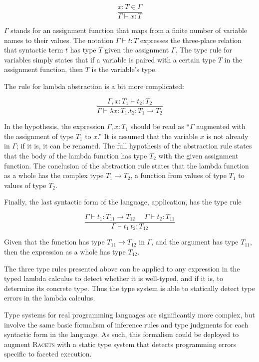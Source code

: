 \documentclass{article}
\begin{document}
\[
\frac{x : T \in \Gamma}
{\Gamma \vdash x : T}
\]

$\Gamma$ stands for an assignment function that maps from a finite number of variable names to their values. The notation $\Gamma \vdash t : T$ expresses the three-place relation that syntactic term $t$ has type $T$ given the assignment $\Gamma$. The type rule for variables simply states that if a variable is paired with a certain type $T$ in the assignment function, then $T$ is the variable's type.

The rule for lambda abstraction is a bit more complicated:

\[
\frac{\Gamma, x : T_1 \vdash t_2 : T_2}
{\Gamma \vdash \lambda x : T_1 . t_2 : T_1 \to T_2}
\]

In the hypothesis, the expression $\Gamma, x : T_1$ should be read as ``$\Gamma$ augmented with the assignment of type $T_1$ to $x$.'' It is assumed that the variable $x$ is not already in $\Gamma$; if it is, it can be renamed. The full hypothesis of the abstraction rule states that the body of the lambda function has type $T_2$ with the given assignment function. The conclusion of the abstraction rule states that the lambda function as a whole has the complex type $T_1 \to T_2$, a function from values of type $T_1$ to values of type $T_2$.

Finally, the last syntactic form of the language, application, has the type rule

\[
\frac{\Gamma \vdash t_1 : T_{11} \to T_{12}\ \ \ \ \ \ \Gamma \vdash t_2 : T_{11}}
{\Gamma \vdash t_1\ t_2 : T_{12}}
\]

Given that the function has type $T_{11} \to T_{12}$ in $\Gamma$, and the argument has type $T_{11}$, then the expression as a whole has type $T_{12}$.

The three type rules presented above can be applied to any expression in the typed lambda calculus to detect whether it is well-typed, and if it is, to determine its concrete type. Thus the type system is able to statically detect type errors in the lambda calculus.

Type systems for real programming languages are significantly more complex, but involve the same basic formalism of inference rules and type judgments for each syntactic form in the language. As such, this formalism could be deployed to augment \textsc{Racets} with a static type system that detects programming errors specific to faceted execution.
\end{document}
